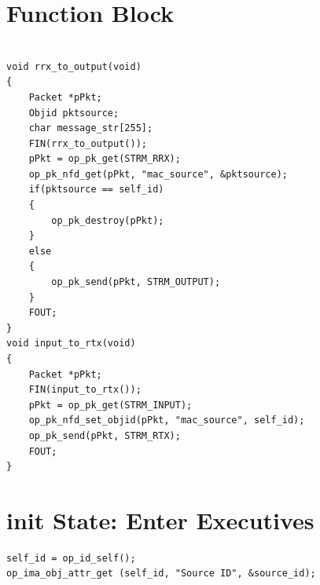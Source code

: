 \section{Function Block}
{\tiny
\begin{verbatim}

void rrx_to_output(void)
{
	Packet *pPkt;
	Objid pktsource;
	char message_str[255];
	FIN(rrx_to_output());
	pPkt = op_pk_get(STRM_RRX);
	op_pk_nfd_get(pPkt, "mac_source", &pktsource);
	if(pktsource == self_id)
	{		
		op_pk_destroy(pPkt);
	}
	else
	{
		op_pk_send(pPkt, STRM_OUTPUT);
	}
	FOUT;
}
void input_to_rtx(void)
{
	Packet *pPkt;
	FIN(input_to_rtx());
	pPkt = op_pk_get(STRM_INPUT);
	op_pk_nfd_set_objid(pPkt, "mac_source", self_id);
	op_pk_send(pPkt, STRM_RTX);
	FOUT;
}

\end{verbatim}
}

\section{init State: Enter Executives}
{\tiny
\begin{verbatim}
self_id = op_id_self();
op_ima_obj_attr_get (self_id, "Source ID", &source_id);

\end{verbatim}
}
